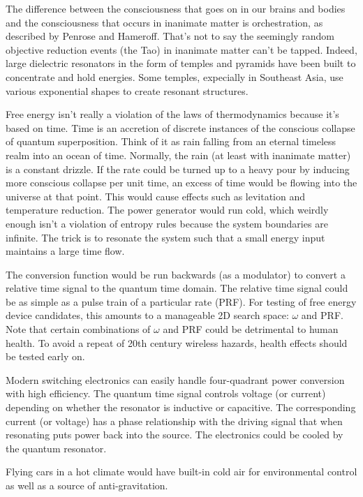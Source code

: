 The difference between the consciousness that goes on in our brains and bodies
and the consciousness that occurs in inanimate matter is orchestration,
as described by Penrose and Hameroff. That's not to say the seemingly random
objective reduction events (the Tao) in inanimate matter can't be tapped.
Indeed, large dielectric resonators in the form of temples and pyramids have
been built to concentrate and hold energies.
Some temples, expecially in Southeast Asia, use various exponential shapes
to create resonant structures.

Free energy isn't really a violation of the laws of thermodynamics because it's
based on time. Time is an accretion of discrete instances of the conscious
collapse of quantum superposition.
Think of it as rain falling from an eternal timeless realm into an ocean of
time. Normally, the rain (at least with inanimate matter) is a constant drizzle.
If the rate could be turned up to a heavy pour by inducing more conscious
collapse per unit time, an excess of time would be flowing into the universe at
that point.
This would cause effects such as levitation and temperature reduction.
The power generator would run cold, which weirdly enough isn't a violation
of entropy rules because the system boundaries are infinite.
The trick is to resonate the system such that a small energy input maintains
a large time flow.

The conversion function would be run backwards (as a modulator) to convert a
relative time signal to the quantum time domain. The relative time signal could
be as simple as a pulse train of a particular rate (PRF).
For testing of free energy device candidates, this amounts to a manageable 2D
search space: $\omega$ and PRF.
Note that certain combinations of $\omega$ and PRF could be detrimental to
human health. To avoid a repeat of 20th century wireless hazards,
health effects should be tested early on.

Modern switching electronics can easily handle four-quadrant power conversion
with high efficiency.
The quantum time signal controls voltage (or current) depending on whether the
resonator is inductive or capacitive.
The corresponding current (or voltage) has a phase relationship
with the driving signal that when resonating puts power back into the source.
The electronics could be cooled by the quantum resonator.

Flying cars in a hot climate would have built-in cold air for environmental
control as well as a source of anti-gravitation.

